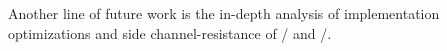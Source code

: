 Another line of future work is the in-depth analysis of implementation optimizations and side channel-resistance of \bison/ and \wisent/.


